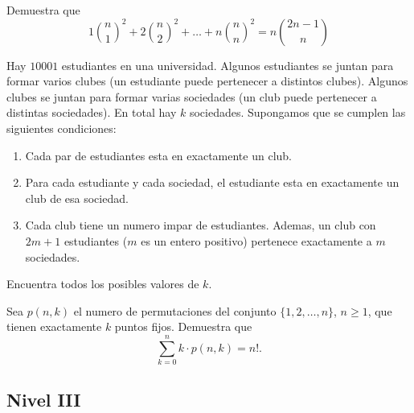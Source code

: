 \documentclass[11pt]{scrartcl}
\begin{document}
\begin{problem}
    Demuestra que 
    \[1\binom{n}{1}^2+2\binom{n}{2}^2+\ldots+n\binom{n}{n}^2=n\binom{2n-1}{n}\]
\end{problem}

\begin{problem}
    Hay $10001$ estudiantes en una universidad. Algunos estudiantes se juntan para formar varios clubes (un estudiante puede pertenecer a distintos clubes). Algunos clubes se juntan para formar varias sociedades (un club puede pertenecer a distintas sociedades). En total hay $k$ sociedades. Supongamos que se cumplen las siguientes condiciones:
\begin{enumerate}
    \item Cada par de estudiantes esta en exactamente un club.

\item  Para cada estudiante y cada sociedad, el estudiante esta en exactamente un club de esa sociedad.

\item  Cada club tiene un numero impar de estudiantes. Ademas, un club con ${2m+1}$ estudiantes ($m$ es un entero positivo) pertenece exactamente a $m$ sociedades.
\end{enumerate}
Encuentra todos los posibles valores de $k$.
\end{problem}

\begin{problem} %
    Sea $p(n,k)$ el numero de permutaciones del conjunto $\{1,2,\dots,n\}$, $n\ge 1$, que tienen exactamente $k$ puntos fijos. Demuestra que
\[
\sum_{k=0}^{n} k\cdot p(n,k)=n!.
\]
\end{problem}

\subsection{Nivel III}
\end{document}
